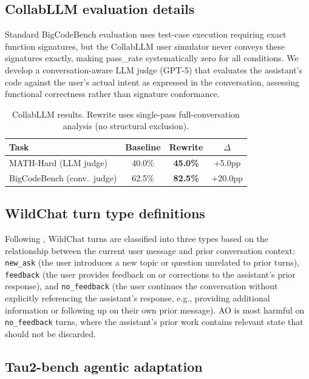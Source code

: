 \documentclass{article}
\begin{document}
\subsection{CollabLLM evaluation details}
\label{app:collabllm}

Standard BigCodeBench evaluation uses test-case execution requiring exact function signatures, but the CollabLLM user simulator never conveys these signatures exactly, making pass\_rate systematically zero for all conditions. We develop a conversation-aware LLM judge (GPT-5) that evaluates the assistant's code against the user's actual intent as expressed in the conversation, assessing functional correctness rather than signature conformance.

\begin{table}[h]
\centering
\begin{tabular}{lccc}
\toprule
\textbf{Task} & \textbf{Baseline} & \textbf{Rewrite} & \textbf{$\Delta$} \\
\midrule
MATH-Hard (LLM judge) & 40.0\% & \textbf{45.0\%} & +5.0pp \\
BigCodeBench (conv.\ judge) & 62.5\% & \textbf{82.5\%} & +20.0pp \\
\bottomrule
\end{tabular}
\caption{CollabLLM results. Rewrite uses single-pass full-conversation analysis (no structural exclusion).}
\label{tab:collabllm}
\end{table}

\subsection{WildChat turn type definitions}
\label{app:wildchat-turns}

Following \citet{huang2026context}, WildChat turns are classified into three types based on the relationship between the current user message and prior conversation context: \texttt{new\_ask} (the user introduces a new topic or question unrelated to prior turns), \texttt{feedback} (the user provides feedback on or corrections to the assistant's prior response), and \texttt{no\_feedback} (the user continues the conversation without explicitly referencing the assistant's response, e.g., providing additional information or following up on their own prior message). AO is most harmful on \texttt{no\_feedback} turns, where the assistant's prior work contains relevant state that should not be discarded.

\subsection{Tau2-bench agentic adaptation}
\label{app:agentic-methods}
\end{document}

